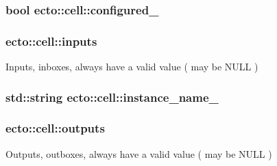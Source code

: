 \subsubsection[{\texorpdfstring{configured\+\_\+}{configured_}}]{\setlength{\rightskip}{0pt plus 5cm}bool ecto\+::cell\+::configured\+\_\+\hspace{0.3cm}{\ttfamily [private]}}\hypertarget{structecto_1_1cell_a187d36610ae8035e9f589de06ecc0d0a}{}\label{structecto_1_1cell_a187d36610ae8035e9f589de06ecc0d0a}
\subsubsection[{\texorpdfstring{inputs}{inputs}}]{ ecto\+::cell\+::inputs}\hypertarget{structecto_1_1cell_a65099b0458a7761b8bfa7a1ddc17e92f}{}\label{structecto_1_1cell_a65099b0458a7761b8bfa7a1ddc17e92f}


Inputs, inboxes, always have a valid value ( may be N\+U\+LL ) 

\subsubsection[{\texorpdfstring{instance\+\_\+name\+\_\+}{instance_name_}}]{\setlength{\rightskip}{0pt plus 5cm}std\+::string ecto\+::cell\+::instance\+\_\+name\+\_\+\hspace{0.3cm}{\ttfamily [private]}}\hypertarget{structecto_1_1cell_a2bf4e65c7a699624c61d3b55cfac45ed}{}\label{structecto_1_1cell_a2bf4e65c7a699624c61d3b55cfac45ed}
\subsubsection[{\texorpdfstring{outputs}{outputs}}]{ ecto\+::cell\+::outputs}\hypertarget{structecto_1_1cell_a93951743b603faba35312ebdb07ceb22}{}\label{structecto_1_1cell_a93951743b603faba35312ebdb07ceb22}


Outputs, outboxes, always have a valid value ( may be N\+U\+LL ) 

